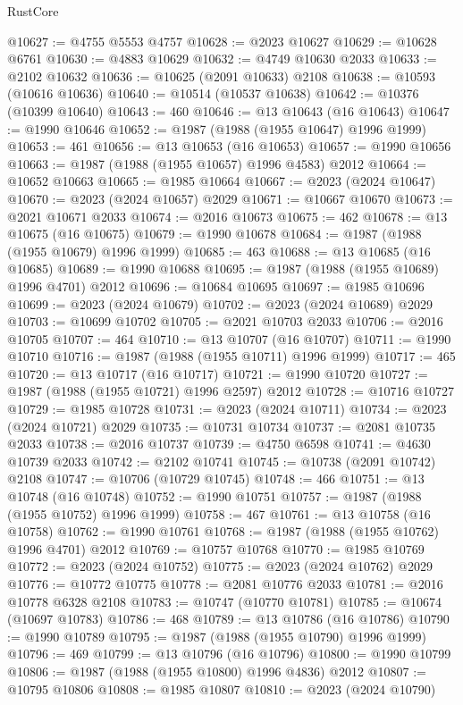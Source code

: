 \begin{lexlean}{RustCore}
\begin{coremodule}
@10627 := @4755 @5553 @4757
@10628 := @2023 @10627
@10629 := @10628 @6761
@10630 := @4883 @10629
@10632 := @4749 @10630 @2033
@10633 := @2102 @10632
@10636 := @10625 (@2091 @10633) @2108
@10638 := @10593 (@10616 @10636)
@10640 := @10514 (@10537 @10638)
@10642 := @10376 (@10399 @10640)
@10643 := 460
@10646 := @13 @10643 (@16 @10643)
@10647 := @1990 @10646
@10652 := @1987 (@1988 (@1955 @10647) @1996 @1999)
@10653 := 461
@10656 := @13 @10653 (@16 @10653)
@10657 := @1990 @10656
@10663 := @1987 (@1988 (@1955 @10657) @1996 @4583) @2012
@10664 := @10652 @10663
@10665 := @1985 @10664
@10667 := @2023 (@2024 @10647)
@10670 := @2023 (@2024 @10657) @2029
@10671 := @10667 @10670
@10673 := @2021 @10671 @2033
@10674 := @2016 @10673
@10675 := 462
@10678 := @13 @10675 (@16 @10675)
@10679 := @1990 @10678
@10684 := @1987 (@1988 (@1955 @10679) @1996 @1999)
@10685 := 463
@10688 := @13 @10685 (@16 @10685)
@10689 := @1990 @10688
@10695 := @1987 (@1988 (@1955 @10689) @1996 @4701) @2012
@10696 := @10684 @10695
@10697 := @1985 @10696
@10699 := @2023 (@2024 @10679)
@10702 := @2023 (@2024 @10689) @2029
@10703 := @10699 @10702
@10705 := @2021 @10703 @2033
@10706 := @2016 @10705
@10707 := 464
@10710 := @13 @10707 (@16 @10707)
@10711 := @1990 @10710
@10716 := @1987 (@1988 (@1955 @10711) @1996 @1999)
@10717 := 465
@10720 := @13 @10717 (@16 @10717)
@10721 := @1990 @10720
@10727 := @1987 (@1988 (@1955 @10721) @1996 @2597) @2012
@10728 := @10716 @10727
@10729 := @1985 @10728
@10731 := @2023 (@2024 @10711)
@10734 := @2023 (@2024 @10721) @2029
@10735 := @10731 @10734
@10737 := @2081 @10735 @2033
@10738 := @2016 @10737
@10739 := @4750 @6598
@10741 := @4630 @10739 @2033
@10742 := @2102 @10741
@10745 := @10738 (@2091 @10742) @2108
@10747 := @10706 (@10729 @10745)
@10748 := 466
@10751 := @13 @10748 (@16 @10748)
@10752 := @1990 @10751
@10757 := @1987 (@1988 (@1955 @10752) @1996 @1999)
@10758 := 467
@10761 := @13 @10758 (@16 @10758)
@10762 := @1990 @10761
@10768 := @1987 (@1988 (@1955 @10762) @1996 @4701) @2012
@10769 := @10757 @10768
@10770 := @1985 @10769
@10772 := @2023 (@2024 @10752)
@10775 := @2023 (@2024 @10762) @2029
@10776 := @10772 @10775
@10778 := @2081 @10776 @2033
@10781 := @2016 @10778 @6328 @2108
@10783 := @10747 (@10770 @10781)
@10785 := @10674 (@10697 @10783)
@10786 := 468
@10789 := @13 @10786 (@16 @10786)
@10790 := @1990 @10789
@10795 := @1987 (@1988 (@1955 @10790) @1996 @1999)
@10796 := 469
@10799 := @13 @10796 (@16 @10796)
@10800 := @1990 @10799
@10806 := @1987 (@1988 (@1955 @10800) @1996 @4836) @2012
@10807 := @10795 @10806
@10808 := @1985 @10807
@10810 := @2023 (@2024 @10790)

\end{coremodule}
\end{lexlean}
